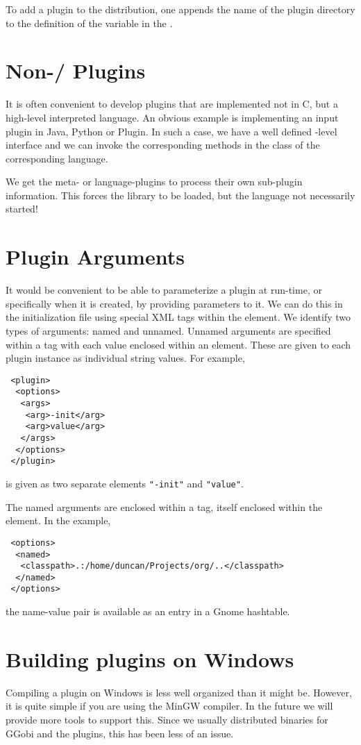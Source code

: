 \documentclass{article}
\def\file#1{\href{#1}{\Escape{#1}}}
\begin{document}
To add a plugin to the distribution, one appends the name of the
plugin directory to the definition of the variable
 in the \file{Install/GNUmakefile.admin}.


\section{Non-\C/\Cplus{} Plugins}

It is often convenient to develop plugins that are implemented not in
C, but a high-level interpreted language.  An obvious example is
implementing an input plugin in Java, Python or Plugin.  In such a
case, we have a well defined \C-level interface and we can invoke the
corresponding methods in the class of the corresponding language.

We get the meta- or language-plugins to process their own sub-plugin
information. This forces the library to be loaded, but the 
language not necessarily started!

\section{Plugin Arguments}
It would be convenient to be able to parameterize a plugin at
run-time, or specifically when it is created, by providing parameters
to it.  We can do this in the initialization file using special XML
tags within the  element.  We identify two types of
arguments: named and unnamed.  Unnamed arguments are specified within
a  tag with each value enclosed within an 
element.  These are given to each plugin instance as
individual string values.
For example,
\begin{verbatim}
 <plugin>
  <options>
   <args>
    <arg>-init</arg>
    <arg>value</arg>
   </args>
  </options>
 </plugin>
\end{verbatim}
is given as two separate elements
\texttt{"-init"} and \texttt{"value"}.

The named arguments are enclosed within a  tag, itself
enclosed within the  element.
In the example,
\begin{verbatim}
 <options>
  <named>
   <classpath>.:/home/duncan/Projects/org/..</classpath>
  </named>
 </options>
\end{verbatim}
the name-value pair is available as an entry in
a Gnome hashtable.



\section{Building plugins on Windows}
Compiling a plugin on Windows is less well organized than it might be.
However, it is quite simple if you are using the MinGW compiler.  In
the future we will provide more tools to support this. Since we
usually distributed binaries for GGobi and the plugins, this has
been less of an issue.
\end{document}
